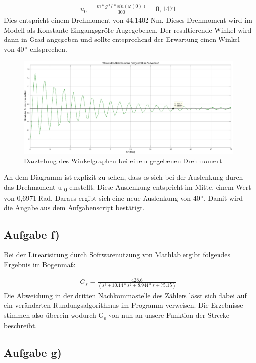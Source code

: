 \documentclass[10pt]{scrartcl}
\begin{document}
\begin{align}
   u_0 = \frac{m*g*l* sin( \varphi (0))}{300} = 0,1471
\end{align}
Dies entspricht einem Drehmoment von 44,1402 Nm. Dieses Drehmoment wird im Modell als Konstante Eingangsgröße Augegebenen. Der resultierende Winkel wird dann in Grad angegeben und sollte entsprechend der Erwartung einen Winkel von 40\,$^\circ$ entsprechen.
\begin{figure}[H]
	\centering
	\includegraphics[width=1.2\textwidth]{Aufgabe9e}
	\caption{Darstelung des Winkelgraphen bei einem gegebenen Drehmoment}
	\label{img:grafik-dummy}
\end{figure}
An dem Diagramm ist explizit zu sehen, dass es sich bei der Auslenkung durch das Drehmoment u \textsubscript{0} einstellt. Diese Auslenkung entspricht im Mitte. einem Wert von 0,6971 Rad. Daraus ergibt sich eine neue Auslenkung von 40\,$^\circ$. Damit wird die Angabe aus dem Aufgabenscript bestätigt.


\subsection{Aufgabe f)}

Bei der Linearisirung durch Softwarenutzung von Mathlab ergibt folgendes Ergebnis im Bogenmaß:

\begin{align}
   G_s = \frac{428.6}{(s^3 + 10.14*s^2 + 8.944*s + 75.15)} 
\end{align}
Die Abweichung in der dritten Nachkommastelle des Zählers lässt sich dabei auf ein veränderten Rundungsalgorithmus im Programm verweisen. 
Die Ergebnisse stimmen also überein wodurch G\textsubscript{s} von nun an unsere Funktion der Strecke beschreibt.

\subsection{Aufgabe g)}
\end{document}
